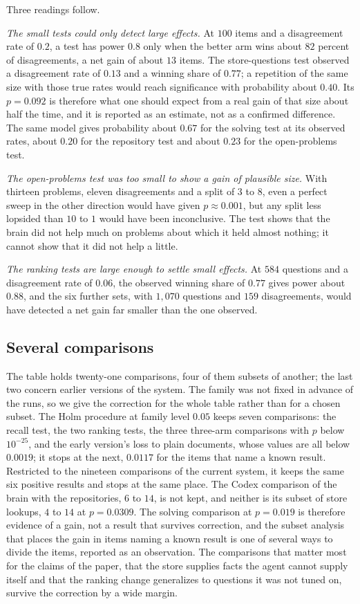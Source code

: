 Three readings follow.

\emph{The small tests could only detect large effects.} At $100$ items and a disagreement rate of $0.2$, a test has power $0.8$ only when the better arm wins about $82$ percent of disagreements, a net gain of about $13$ items. The store-questions test observed a disagreement rate of $0.13$ and a winning share of $0.77$; a repetition of the same size with those true rates would reach significance with probability about $0.40$. Its $p=0.092$ is therefore what one should expect from a real gain of that size about half the time, and it is reported as an estimate, not as a confirmed difference. The same model gives probability about $0.67$ for the solving test at its observed rates, about $0.20$ for the repository test and about $0.23$ for the open-problems test.

\emph{The open-problems test was too small to show a gain of plausible size.} With thirteen problems, eleven disagreements and a split of $3$ to $8$, even a perfect sweep in the other direction would have given $p\approx0.001$, but any split less lopsided than $10$ to $1$ would have been inconclusive. The test shows that the brain did not help much on problems about which it held almost nothing; it cannot show that it did not help a little.

\emph{The ranking tests are large enough to settle small effects.} At $584$ questions and a disagreement rate of $0.06$, the observed winning share of $0.77$ gives power about $0.88$, and the six further sets, with $1{,}070$ questions and $159$ disagreements, would have detected a net gain far smaller than the one observed.

\subsection{Several comparisons}
The table holds twenty-one comparisons, four of them subsets of another; the last two concern earlier versions of the system. The family was not fixed in advance of the runs, so we give the correction for the whole table rather than for a chosen subset. The Holm procedure at family level $0.05$ keeps seven comparisons: the recall test, the two ranking tests, the three three-arm comparisons with $p$ below $10^{-25}$, and the early version's loss to plain documents, whose values are all below $0.0019$; it stops at the next, $0.0117$ for the items that name a known result. Restricted to the nineteen comparisons of the current system, it keeps the same six positive results and stops at the same place. The Codex comparison of the brain with the repositories, $6$ to $14$, is not kept, and neither is its subset of store lookups, $4$ to $14$ at $p=0.0309$. The solving comparison at $p=0.019$ is therefore evidence of a gain, not a result that survives correction, and the subset analysis that places the gain in items naming a known result is one of several ways to divide the items, reported as an observation. The comparisons that matter most for the claims of the paper, that the store supplies facts the agent cannot supply itself and that the ranking change generalizes to questions it was not tuned on, survive the correction by a wide margin.
